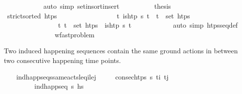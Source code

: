 \begin{isabellebody}
\ \ \ \ \ \ \ \ \ \ \isamarkupfalse%
\ {\isacharparenleft}{\kern0pt}auto\ simp{\isacharcolon}{\kern0pt}\ set{\isacharunderscore}{\kern0pt}insort{\isacharunderscore}{\kern0pt}insert{\isacharparenright}{\kern0pt}\isanewline
\ \ \ \ \ \ \ \ \isamarkupfalse%
\ {\isacharquery}{\kern0pt}thesis\ \isanewline
\ \ \ \ \ \ \ \ \ \ \isamarkupfalse%
\ {\isacartoucheopen}strict{\isacharunderscore}{\kern0pt}sorted\ htps{\isacartoucheclose}\ \isanewline
\ \ \ \ \ \ \ \ \ \ \ \ \ \ \ \ {\isacartoucheopen}{\isasymforall}t{\isachardot}{\kern0pt}\ is{\isacharunderscore}{\kern0pt}htp\ {\isacharparenleft}{\kern0pt}{\isasympi}{\isacharhash}{\kern0pt}{\isasympi}s{\isacharparenright}{\kern0pt}\ t\ {\isasymlongrightarrow}\ t\ {\isasymin}\ set\ htps{\isacartoucheclose}\ \isanewline
\ \ \ \ \ \ \ \ \ \ \ \ \ \ \ \ {\isacartoucheopen}{\isasymforall}t{\isachardot}{\kern0pt}\ t\ {\isasymin}\ set\ htps\ {\isasymlongrightarrow}\ is{\isacharunderscore}{\kern0pt}htp\ {\isacharparenleft}{\kern0pt}{\isasympi}{\isacharhash}{\kern0pt}{\isasympi}s{\isacharparenright}{\kern0pt}\ t{\isacartoucheclose}\isanewline
\ \ \ \ \ \ \ \ \ \ \isamarkupfalse%
\ {\isacharparenleft}{\kern0pt}auto\ simp{\isacharcolon}{\kern0pt}\ htps{\isacharunderscore}{\kern0pt}seq{\isacharunderscore}{\kern0pt}def{\isacharparenright}{\kern0pt}\isanewline
\ \ \ \ \ \ \isamarkupfalse%
\isanewline
\ \ \ \ \isamarkupfalse%
\isanewline
\ \ \isamarkupfalse%
%
\endisatagproof
{\isafoldproof}%
%
\isadelimproof
\isanewline
%
\endisadelimproof
\isanewline
{}\isamarkupfalse%
\isanewline
\isanewline
{}\isamarkupfalse%
\ wf{\isacharunderscore}{\kern0pt}ast{\isacharunderscore}{\kern0pt}problem\isanewline
{}%
\begin{isamarkuptext}%
Two induced happening sequences contain the same ground actions in between two 
  consecutive happening time points.%
\end{isamarkuptext}\isamarkuptrue%
\ \ \isamarkupfalse%
\ ind{\isacharunderscore}{\kern0pt}happ{\isacharunderscore}{\kern0pt}seqs{\isacharunderscore}{\kern0pt}same{\isacharunderscore}{\kern0pt}acts{\isacharunderscore}{\kern0pt}leq\isactrlsub i{\isacharunderscore}{\kern0pt}le\isactrlsub j{\isacharcolon}{\kern0pt}\isanewline
\ \ \ \ \ {\isachardoublequoteopen}consec{\isacharunderscore}{\kern0pt}htps\ {\isasympi}s\ t\isactrlsub i\ t\isactrlsub j{\isachardoublequoteclose}\ \isanewline
\ \ \ \ \ \ \ \ \ {\isachardoublequoteopen}ind{\isacharunderscore}{\kern0pt}happ{\isacharunderscore}{\kern0pt}seq\ {\isasympi}s\ hs\ \isanewline

\end{isabellebody}
